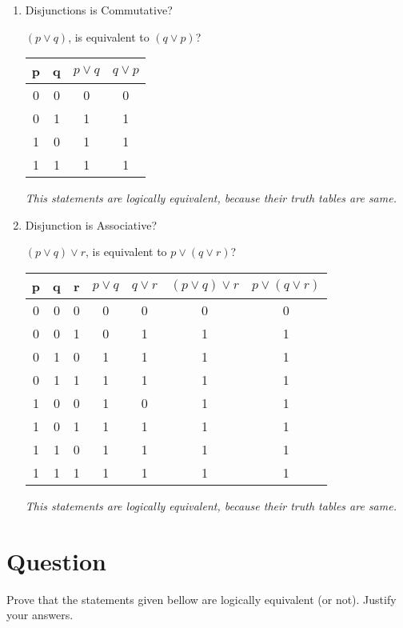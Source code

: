 \documentclass[a4paper,11pt]{article}
\begin{document}
\begin{enumerate}[label=\alph*)]
  \item
  Disjunctions is Commutative?

  $(p \vee q)$, is equivalent to $(q \vee p)$?

  \begin{tabular}{|cc|cc|}
    \hline
    p & q & $p \vee q$ & $q \vee p$\\
    \hline
    0 & 0 & 0 & 0\\
    0 & 1 & 1 & 1\\
    1 & 0 & 1 & 1\\
    1 & 1 & 1 & 1\\
    \hline
  \end{tabular}

  \emph{This statements are logically equivalent, because their truth tables are same.}

  \item
  Disjunction is Associative?

  $(p \vee q) \vee r$, is equivalent to $p \vee (q \vee r)$?

  \begin{tabular}{|ccc|cccc|}
    \hline
    p & q & r & $p \vee q$ & $q \vee r$ & $(p \vee q) \vee r$ & $p \vee (q \vee r)$\\
    \hline
    0 & 0 & 0 & 0 & 0 & 0 & 0\\
    0 & 0 & 1 & 0 & 1 & 1 & 1\\
    0 & 1 & 0 & 1 & 1 & 1 & 1\\
    0 & 1 & 1 & 1 & 1 & 1 & 1\\
    1 & 0 & 0 & 1 & 0 & 1 & 1\\
    1 & 0 & 1 & 1 & 1 & 1 & 1\\
    1 & 1 & 0 & 1 & 1 & 1 & 1\\
    1 & 1 & 1 & 1 & 1 & 1 & 1\\
    \hline
  \end{tabular}

  \emph{This statements are logically equivalent, because their truth tables are same.}

\end{enumerate}

\section{Question}
\label{sec:Question}
Prove that the statements given bellow are logically equivalent (or not). Justify your answers.
\end{document}
